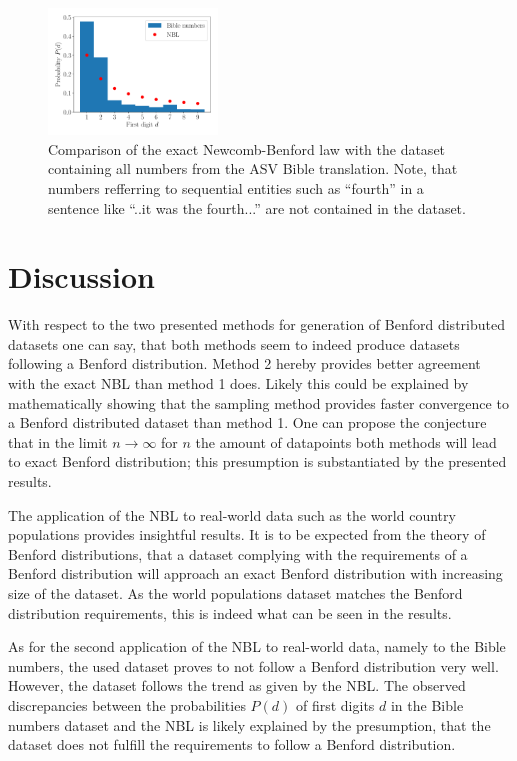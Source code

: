 \documentclass[a4paper,10pt, twocolumn]{article}
\begin{document}
\begin{figure}[h]
	\centering
	\includegraphics[width=0.4\textwidth]{figures/bible_numbers.pdf}
	\caption{Comparison of the exact Newcomb-Benford law with the dataset containing all numbers from the ASV Bible translation. Note, that numbers refferring to sequential entities such as ``fourth'' in a sentence like ``..it was the fourth...'' are not contained in the dataset.}
	\label{fig:bible_numbers}
\end{figure}

\section{Discussion}
With respect to the two presented methods for generation of Benford distributed datasets one can say, that both methods seem to indeed produce datasets following a Benford distribution. Method 2 hereby provides better agreement with the exact NBL than method 1 does. Likely this could be explained by mathematically showing that the sampling method provides faster convergence to a Benford distributed dataset than method 1. One can propose the conjecture that in the limit $n \rightarrow \infty$ for $n$ the amount of datapoints both methods will lead to exact Benford distribution; this presumption is substantiated by the presented results.

The application of the NBL to real-world data such as the world country populations provides insightful results. It is to be expected from the theory of Benford distributions, that a dataset complying with the requirements of a Benford distribution will approach an exact Benford distribution with increasing size of the dataset. As the world populations dataset matches the Benford distribution requirements, this is indeed what can be seen in the results.

As for the second application of the NBL to real-world data, namely to the Bible numbers, the used dataset proves to not follow a Benford distribution very well. However, the dataset follows the trend as given by the NBL. The observed discrepancies between the probabilities $P(d)$ of first digits $d$ in the Bible numbers dataset and the NBL is likely explained by the presumption, that the dataset does not fulfill the requirements to follow a Benford distribution.
\end{document}
